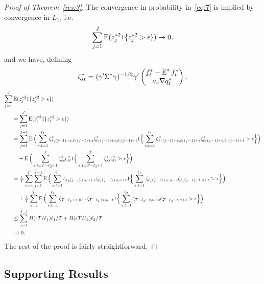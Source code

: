 \documentclass[12pt,fleqn]{article}
\begin{document}
\begin{proof}[Proof of Theorem~\ref{res:3}]
   The convergence in probability in~\eqref{eq:7} is implied by
   convergence in $L_1$, i.e.
   \begin{equation*}
     \sum_{j=1}^J \operatorname{E}(z_j^{*2} 1\{z_j^{*2} > \epsilon\}) \to 0,
   \end{equation*}
   and we have, defining
   \begin{equation*}
     \zeta_{st}^* =
     (\gamma'\Sigma^*\gamma)^{-1/2} \gamma'\begin{pmatrix}
       f_t^* - \operatorname{E}^* f_t^* \\
       a_s \nabla q_t^*
     \end{pmatrix},
   \end{equation*}
   \begin{align*}
     \sum_{j=1}^J &\operatorname{E}(z_j^{*2} 1\{z_j^{*2} > \epsilon\}) \\
     &= \sum_{j=1}^J \operatorname{E}(z_j^{*2} 1\{z_j^{*2} > \epsilon\}) \\
     &= \sum_{j=1}^{J-1} \operatorname{E}\Big(\sum_{s,t =1}^{\ell_1} \zeta^*_{\ell_1 (j-1)+s,\ell_1 (j-1)+s}\zeta^*_{\ell_1 (j-1)+t,\ell_1 (j-1)+t}
     1\Big\{ \sum_{s,t = 1}^{\ell_1} \zeta^*_{\ell_1 (j-1)+s,\ell_1 (j-1)+s}\zeta^*_{\ell_1 (j-1)+t,\ell_1 (j-1)+t} > \epsilon\Big\}\Big) \\
     &\quad +
     \operatorname{E}\Big(\sum_{s,t = T-\ell_2+1}^{T} \zeta^*_{ss}\zeta^*_{tt} 1\Big\{\sum_{s,t = T - \ell_2+1}^{T} \zeta^*_{ss}\zeta^*_{tt} > \epsilon\Big\}\Big) \\
     &= \tfrac{1}{T} \sum_{u=1}^T \sum_{j=1}^{J-1} \operatorname{E}\Big(\sum_{s,t = 1}^{\ell_1} \zeta_{\ell_1(j-1) + s,u+s}\zeta_{\ell_1(j-1) + t,u+t}
     1\Big\{\sum_{s,t = 1}^{\ell_1} \zeta_{\ell_1(j-1) + s,u+s}\zeta_{\ell_1(j-1) + t,u+t} > \epsilon\Big\}\Big) \\
     &\quad +
     \tfrac{1}{T} \sum_{u=1}^T \operatorname{E}\Big(\sum_{s,t = 1}^{\ell_2} \zeta_{T-\ell_2 + s,u+s}\zeta_{T-\ell_2+t,u+t}
     1\Big\{\sum_{s,t = 1}^{\ell_2} \zeta_{T-\ell_2 + s,u+s}\zeta_{T-\ell_2+t,u+t} > \epsilon\Big\}\Big) \\
     &\leq \sum_{j=1}^{J-1} B(\epsilon T / \ell_1) \ell_1 / T
     + B(\epsilon T / \ell_2) \ell_2/T \\
     &\to 0.
   \end{align*}
   The rest of the proof is fairly straightforward.
\end{proof}

\subsection{Supporting Results}
\end{document}
